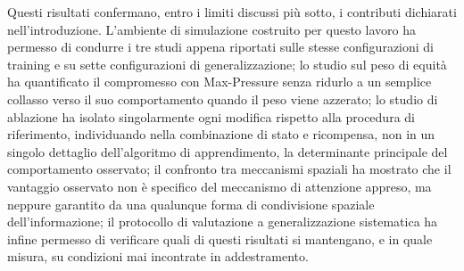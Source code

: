Questi risultati confermano, entro i limiti discussi più sotto, i
contributi dichiarati nell'introduzione. L'ambiente di simulazione
costruito per questo lavoro ha permesso di condurre i tre studi appena
riportati sulle stesse configurazioni di training e su sette
configurazioni di generalizzazione; lo studio sul peso di equità ha
quantificato il compromesso con Max-Pressure senza ridurlo a un semplice
collasso verso il suo comportamento quando il peso viene azzerato; lo
studio di ablazione ha isolato singolarmente ogni modifica rispetto alla
procedura di riferimento, individuando nella combinazione di stato e
ricompensa, non in un singolo dettaglio dell'algoritmo di apprendimento,
la determinante principale del comportamento osservato; il confronto tra
meccanismi spaziali ha mostrato che il vantaggio osservato non è
specifico del meccanismo di attenzione appreso, ma neppure garantito da
una qualunque forma di condivisione spaziale dell'informazione; il
protocollo di valutazione a generalizzazione sistematica ha infine
permesso di verificare quali di questi risultati si mantengano, e in
quale misura, su condizioni mai incontrate in addestramento.

